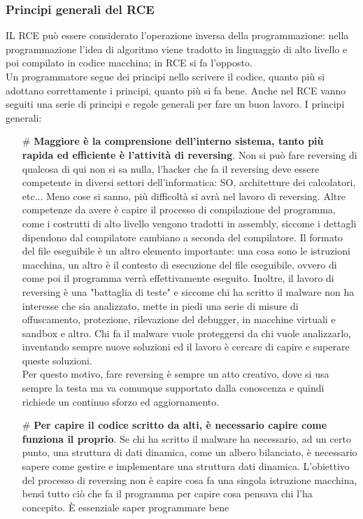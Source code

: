 \documentclass{article}
\begin{document}
\subsubsection{Principi generali del RCE}
IL RCE può essere considerato l'operazione inversa della programmazione: nella programmazione l'idea di algoritmo viene tradotto in linguaggio di alto livello e poi compilato in codice macchina; in RCE si fa l'opposto.\\ Un programmatore segue dei principi nello scrivere il codice, quanto più si adottano correttamente i principi, quanto più si fa bene. Anche nel RCE vanno seguiti una serie di principi e regole generali per fare un buon lavoro. I principi generali:
\begin{itemize}
\item[\#] \textbf{Maggiore è la comprensione dell'interno sistema, tanto più rapida ed efficiente è l'attività di reversing}. Non si può fare reversing di qualcosa di qui non si sa nulla, l'hacker che fa il reversing deve essere competente in diversi settori dell'informatica: SO, architetture dei calcolatori, etc... Meno cose si sanno, più difficoltà si avrà nel lavoro di reversing. Altre competenze da avere è capire il processo di compilazione del programma, come i costrutti di alto livello vengono tradotti in assembly, siccome i dettagli dipendono dal compilatore cambiano a seconda del compilatore. Il formato del file eseguibile è un altro elemento importante: una cosa sono le istruzioni macchina, un altro è il contesto di esecuzione del file eseguibile, ovvero di come poi il programma verrà effettivamente eseguito. Inoltre, il lavoro di reversing è una "battaglia di teste" e siccome chi ha scritto il malware non ha interesse che sia analizzato, mette in piedi una serie di misure di offuscamento, protezione, rilevazione del debugger, in macchine virtuali e sandbox e altro. Chi fa il malware vuole proteggersi da chi vuole analizzarlo, inventando sempre nuove soluzioni ed il lavoro è cercare di capire e superare queste soluzioni.\\ Per questo motivo, fare reversing è sempre un atto creativo, dove si usa sempre la testa ma va comunque supportato dalla conoscenza e quindi richiede un continuo sforzo ed aggiornamento.
\item[\#] \textbf{Per capire il codice scritto da alti, è necessario capire come funziona il proprio}. Se chi ha scritto il malware ha necessario, ad un certo punto, una struttura di dati dinamica, come un albero bilanciato, è necessario sapere come gestire e implementare una struttura dati dinamica. L'obiettivo del processo di reversing non è capire cosa fa una singola istruzione macchina, bensì tutto ciò che fa il programma per capire cosa pensava chi l'ha concepito. È essenziale saper programmare bene

\end{itemize}
\end{document}
